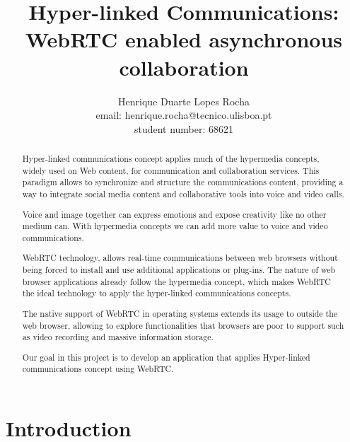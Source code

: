 \documentclass{llncs}
\begin{document}
\pagestyle{plain}
\mainmatter              %

\title{Hyper-linked Communications: WebRTC enabled asynchronous collaboration}
\author{%
	Henrique Duarte Lopes Rocha \\
	email: henrique.rocha@tecnico.ulisboa.pt \\
  student number: 68621
}
\maketitle              %

\begin{abstract}
Hyper-linked communications concept applies much of the hypermedia concepts, widely used on Web content, for communication and collaboration services. This paradigm allows to synchronize and structure the communications content, providing a way to integrate social media content and collaborative tools into voice and video calls.

Voice and image together can express emotions and expose creativity like no other medium can. With hypermedia concepts we can add more value to voice and video communications.

WebRTC technology, allows real-time communications between web browsers without being forced to install and use additional applications or plug-ins. The nature of web browser applications already follow the hypermedia concept, which makes WebRTC the ideal technology to apply the hyper-linked communications concepts.

The native support of WebRTC in operating systems extends its usage to outside the web browser, allowing to explore functionalities that browsers are poor to support such as video recording and massive information storage.

Our goal in this project is to develop an application that applies Hyper-linked communications concept using WebRTC.

\end{abstract}

\section{Introduction}
  
\end{document}
